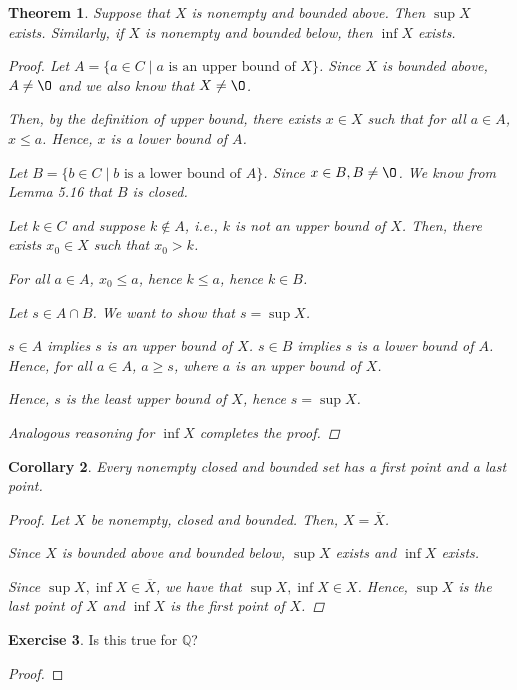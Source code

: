 \documentclass[11pt]{article}
\renewcommand{\emptyset}{\O}
\renewcommand{\_}[1]{\underline{ #1 }}
\newtheorem{theorem}{Theorem}[section]
\newtheorem{corollary}[theorem]{Corollary}
\theoremstyle{definition}
\newtheorem{exercise}[theorem]{Exercise}
\numberwithin{equation}{subsection}
\begin{document}
\begin{theorem}  Suppose that $X$ is nonempty and bounded above. Then $\sup X$ exists. Similarly, if $X$ is nonempty and bounded below, then $\inf X$ exists.
\begin{proof}
Let $A = \{a \in C \mid a \text{ is an upper bound of } X \}$. Since $X$ is bounded above, $A \neq \emptyset$ and we also know that $X \neq \emptyset$. 

Then, by the definition of upper bound, there exists $x\in X$ such that for all $a \in A$, $x \leq a$. Hence, $x$ is a lower bound of $A$.

Let $B = \{b \in C \mid b \text{ is a lower bound of } A \}$. Since $x \in B, B\neq \emptyset$. We know from Lemma 5.16 that $B$ is closed.

Let $k \in C$ and suppose $k \notin A$, i.e., $k$ is not an upper bound of $X$. Then, there exists $x_0 \in X$ such that $x_0>k$.

For all $a \in A$, $x_0 \leq a$, hence $k \leq a$, hence $k \in B$.

Let $s \in A \cap B$. We want to show that $s = \sup X$.

$s \in A$ implies $s$ is an upper bound of $X$. $s \in B$ implies $s$ is a lower bound of $A$. Hence, for all $a \in A$, $a \geq s$, where $a$ is an upper bound of $X$.

Hence, $s$ is the least upper bound of $X$, hence $s = \sup X$.

Analogous reasoning for $\inf X$ completes the proof.

\renewcommand\qedsymbol{QED}
\end{proof}
\end{theorem}

\begin{corollary}  Every nonempty closed and bounded set has a first point and a last point.
\begin{proof}
Let $X$ be nonempty, closed and bounded. Then, $X = \overline{X}$.

Since $X$ is bounded above and bounded below, $\sup X$ exists and $\inf X$ exists.

Since $\sup X, \inf X \in \overline{X}$, we have that $\sup X, \inf X \in X$. Hence, $\sup X$ is the last point of $X$ and $\inf X$ is the first point of $X$.

\renewcommand\qedsymbol{QED}
\end{proof}
\end{corollary}


\begin{exercise}  Is this true for $\mathbb{Q}$?
\begin{proof}

\renewcommand\qedsymbol{QED}
\end{proof}
\end{exercise}
\bigskip
\end{document}
